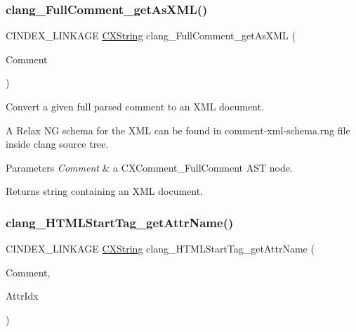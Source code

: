 \subsubsection{\texorpdfstring{clang\+\_\+\+Full\+Comment\+\_\+get\+As\+X\+M\+L()}{clang\_FullComment\_getAsXML()}}
{\footnotesize\ttfamily C\+I\+N\+D\+E\+X\+\_\+\+L\+I\+N\+K\+A\+GE \hyperlink{structCXString}{C\+X\+String} clang\+\_\+\+Full\+Comment\+\_\+get\+As\+X\+ML (\begin{DoxyParamCaption}\item[{\hyperlink{structCXComment}{C\+X\+Comment}}]{Comment }\end{DoxyParamCaption})}



Convert a given full parsed comment to an X\+ML document. 

A Relax NG schema for the X\+ML can be found in comment-\/xml-\/schema.\+rng file inside clang source tree.


\begin{DoxyParams}{Parameters}
{\em Comment} & a {\ttfamily C\+X\+Comment\+\_\+\+Full\+Comment} A\+ST node.\\
\hline
\end{DoxyParams}
\begin{DoxyReturn}{Returns}
string containing an X\+ML document. 
\end{DoxyReturn}
\mbox{\label{group__CINDEX__COMMENT_ga4bdf958af343477fc70eb2b4822cd006}} 
\subsubsection{\texorpdfstring{clang\+\_\+\+H\+T\+M\+L\+Start\+Tag\+\_\+get\+Attr\+Name()}{clang\_HTMLStartTag\_getAttrName()}}
{\footnotesize\ttfamily C\+I\+N\+D\+E\+X\+\_\+\+L\+I\+N\+K\+A\+GE \hyperlink{structCXString}{C\+X\+String} clang\+\_\+\+H\+T\+M\+L\+Start\+Tag\+\_\+get\+Attr\+Name (\begin{DoxyParamCaption}\item[{\hyperlink{structCXComment}{C\+X\+Comment}}]{Comment,  }\item[{unsigned}]{Attr\+Idx }\end{DoxyParamCaption})}


